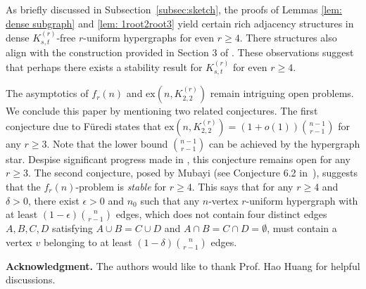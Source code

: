 \documentclass[11pt]{article}
\def\ex{\mathrm{ex}}
\begin{document}
As briefly discussed in Subsection~\ref{subsec:sketch},
the proofs of Lemmas \ref{lem: dense subgraph} and \ref{lem: 1root2root3} yield certain rich adjacency structures in dense $K_{s,t}^{(r)}$-free $r$-uniform hypergraphs for even $r\geq 4$.
There structures also align with the construction provided in Section 3 of \cite{BGJS23}.
These observations suggest that perhaps there exists a stability result for $K_{s,t}^{(r)}$ for even $r\geq 4$.



The asymptotics of $f_r(n)$ and $\ex(n,K_{2,2}^{(r)})$ remain intriguing open problems. 
We conclude this paper by mentioning two related conjectures. 
The first conjecture due to F\"uredi \cite{Fu84} states that $\ex(n,K_{2,2}^{(r)})=(1+o(1))\binom{n-1}{r-1}$ for any $r\geq 3$. 
Note that the lower bound $\binom{n-1}{r-1}$ can be achieved by the hypergraph star.
Despise significant progress made in \cite{MuVe04,PiVe09}, this conjecture remains open for any $r\geq 3$.
The second conjecture, posed by Mubayi (see Conjecture 6.2 in~\cite{Mu07}), suggests that the $f_r(n)$-problem is {\it stable} for $r\geq 4$.
This says that for any $r\geq 4$ and $\delta>0$, there exist $\epsilon>0$ and $n_0$ such that any $n$-vertex $r$-uniform hypergraph with at least $(1-\epsilon)\binom{n}{r-1}$ edges, which does not contain four distinct edges $A, B, C, D$ satisfying $A\cup B=C\cup D$ and $A\cap B=C\cap D=\emptyset$, must contain a vertex $v$ belonging to at least $(1-\delta)\binom{n}{r-1}$ edges.

\bigskip
\medskip

{\noindent\bf Acknowledgment.} The authors would like to thank Prof. Hao Huang for helpful discussions.
\end{document}
